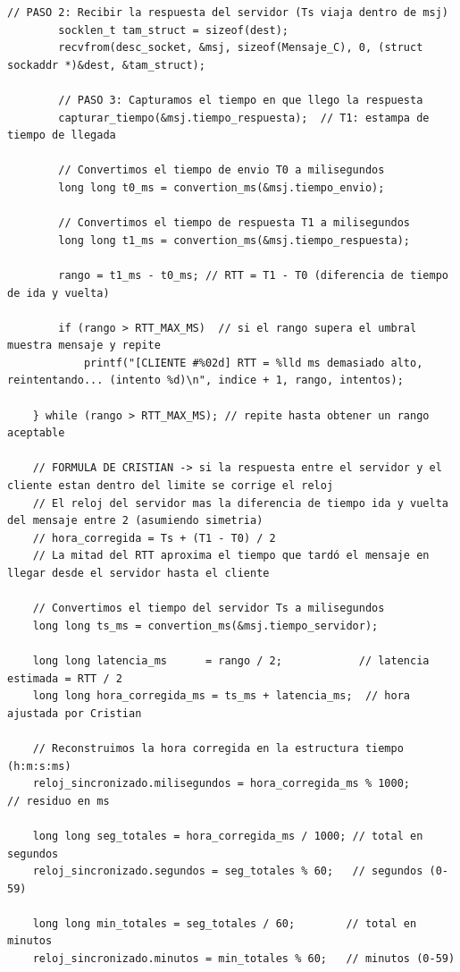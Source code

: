 \begin{lstlisting}[style=estiloC]
        // PASO 2: Recibir la respuesta del servidor (Ts viaja dentro de msj)
        socklen_t tam_struct = sizeof(dest);
        recvfrom(desc_socket, &msj, sizeof(Mensaje_C), 0, (struct sockaddr *)&dest, &tam_struct);

        // PASO 3: Capturamos el tiempo en que llego la respuesta
        capturar_tiempo(&msj.tiempo_respuesta);  // T1: estampa de tiempo de llegada

        // Convertimos el tiempo de envio T0 a milisegundos
        long long t0_ms = convertion_ms(&msj.tiempo_envio);

        // Convertimos el tiempo de respuesta T1 a milisegundos
        long long t1_ms = convertion_ms(&msj.tiempo_respuesta);

        rango = t1_ms - t0_ms; // RTT = T1 - T0 (diferencia de tiempo de ida y vuelta)

        if (rango > RTT_MAX_MS)  // si el rango supera el umbral muestra mensaje y repite
            printf("[CLIENTE #%02d] RTT = %lld ms demasiado alto, reintentando... (intento %d)\n", indice + 1, rango, intentos);

    } while (rango > RTT_MAX_MS); // repite hasta obtener un rango aceptable

    // FORMULA DE CRISTIAN -> si la respuesta entre el servidor y el cliente estan dentro del limite se corrige el reloj
    // El reloj del servidor mas la diferencia de tiempo ida y vuelta del mensaje entre 2 (asumiendo simetria)
    // hora_corregida = Ts + (T1 - T0) / 2
    // La mitad del RTT aproxima el tiempo que tardó el mensaje en llegar desde el servidor hasta el cliente

    // Convertimos el tiempo del servidor Ts a milisegundos
    long long ts_ms = convertion_ms(&msj.tiempo_servidor);

    long long latencia_ms      = rango / 2;            // latencia estimada = RTT / 2
    long long hora_corregida_ms = ts_ms + latencia_ms;  // hora ajustada por Cristian

    // Reconstruimos la hora corregida en la estructura tiempo (h:m:s:ms)
    reloj_sincronizado.milisegundos = hora_corregida_ms % 1000;          // residuo en ms

    long long seg_totales = hora_corregida_ms / 1000; // total en segundos
    reloj_sincronizado.segundos = seg_totales % 60;   // segundos (0-59)

    long long min_totales = seg_totales / 60;        // total en minutos
    reloj_sincronizado.minutos = min_totales % 60;   // minutos (0-59)


\end{lstlisting}
